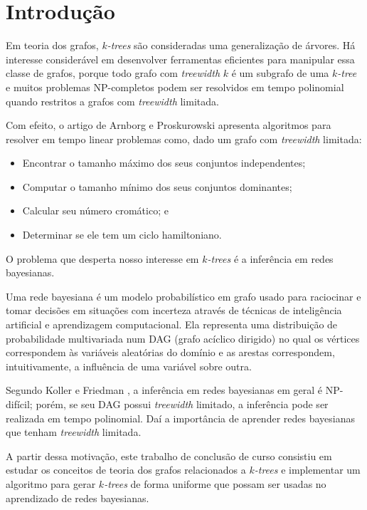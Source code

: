 \chapter{Introdução}
\label{cap:introducao}

Em teoria dos grafos, \emph{$k$-trees} são consideradas uma generalização de árvores. Há interesse considerável em desenvolver ferramentas eficientes para manipular essa classe de grafos, porque todo grafo com \emph{treewidth} $k$ é um subgrafo de uma \emph{$k$-tree} e muitos problemas NP-completos podem ser resolvidos em tempo polinomial quando restritos a grafos com \emph{treewidth} limitada.

Com efeito, o artigo de Arnborg e Proskurowski \cite{arnborg} apresenta algoritmos para resolver em tempo linear problemas como, dado um grafo com \emph{treewidth} limitada:

\begin{itemize}
  \item Encontrar o tamanho máximo dos seus conjuntos independentes;
  \item Computar o tamanho mínimo dos seus conjuntos dominantes;
  \item Calcular seu número cromático; e
  \item Determinar se ele tem um ciclo hamiltoniano.
\end{itemize}

O problema que desperta nosso interesse em \emph{$k$-trees} é a inferência em redes bayesianas.

Uma rede bayesiana é um modelo probabilístico em grafo usado para raciocinar e tomar decisões em situações com incerteza através de técnicas de inteligência artificial e aprendizagem computacional. Ela representa uma distribuição de probabilidade multivariada num DAG (grafo acíclico dirigido) no qual os vértices correspondem às variáveis aleatórias do domínio e as arestas correspondem, intuitivamente, a influência de uma variável sobre outra.

Segundo Koller e Friedman \cite{koller}, a inferência em redes bayesianas em geral é NP-difícil; porém, se seu DAG possui \emph{treewidth} limitado, a inferência pode ser realizada em tempo polinomial. Daí a importância de aprender redes bayesianas que tenham \emph{treewidth} limitada.

A partir dessa motivação, este trabalho de conclusão de curso consistiu em estudar os conceitos de teoria dos grafos relacionados a \emph{$k$-trees} e implementar um algoritmo para gerar \emph{$k$-trees} de forma uniforme que possam ser usadas no aprendizado de redes bayesianas.

